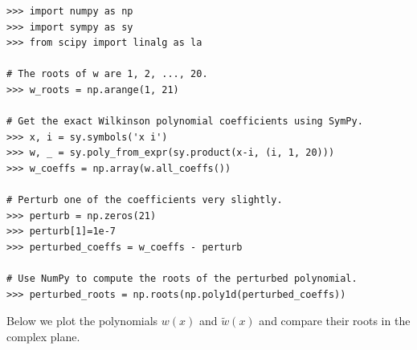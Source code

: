 \begin{lstlisting}
>>> import numpy as np
>>> import sympy as sy
>>> from scipy import linalg as la

# The roots of w are 1, 2, ..., 20.
>>> w_roots = np.arange(1, 21)

# Get the exact Wilkinson polynomial coefficients using SymPy.
>>> x, i = sy.symbols('x i')
>>> w, _ = sy.poly_from_expr(sy.product(x-i, (i, 1, 20)))
>>> w_coeffs = np.array(w.all_coeffs())

# Perturb one of the coefficients very slightly.
>>> perturb = np.zeros(21)
>>> perturb[1]=1e-7
>>> perturbed_coeffs = w_coeffs - perturb

# Use NumPy to compute the roots of the perturbed polynomial.
>>> perturbed_roots = np.roots(np.poly1d(perturbed_coeffs))
\end{lstlisting}

Below we plot the polynomials $w(x)$ and $\tilde{w}(x)$ and compare their roots in the complex plane.

